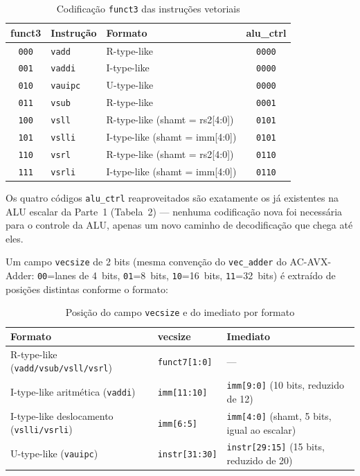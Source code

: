 \documentclass[12pt, a4paper]{article}
\newcommand{\code}[1]{\texttt{#1}}
\begin{document}
\begin{table}[H]
  \centering
  \caption{Codificação \code{funct3} das instruções vetoriais}
  \small{}
  \begin{tabular}{cllc}
    \toprule
    \rowcolor{headerblue}
    \color{white}\textbf{funct3} & \color{white}\textbf{Instrução} &
    \color{white}\textbf{Formato} & \color{white}\textbf{alu\_ctrl} \\
    \midrule
    \code{000} & \code{vadd}  & R-type-like & \code{0000} \\
    \code{001} & \code{vaddi} & I-type-like & \code{0000} \\
    \code{010} & \code{vauipc}& U-type-like & \code{0000} \\
    \code{011} & \code{vsub}  & R-type-like & \code{0001} \\
    \code{100} & \code{vsll}  & R-type-like (shamt = rs2[4:0]) & \code{0101} \\
    \code{101} & \code{vslli} & I-type-like (shamt = imm[4:0]) & \code{0101} \\
    \code{110} & \code{vsrl}  & R-type-like (shamt = rs2[4:0]) & \code{0110} \\
    \code{111} & \code{vsrli} & I-type-like (shamt = imm[4:0]) & \code{0110} \\
    \bottomrule
  \end{tabular}
\end{table}

Os quatro códigos \code{alu\_ctrl} reaproveitados são exatamente os já
existentes na ALU escalar da Parte~1 (Tabela~2) --- nenhuma codificação
nova foi necessária para o controle da ALU, apenas um novo caminho de
decodificação que chega até eles.

Um campo \code{vecsize} de 2 bits (mesma convenção do \code{vec\_adder}
do AC-AVX-Adder: \code{00}=lanes de 4~bits, \code{01}=8~bits,
\code{10}=16~bits, \code{11}=32~bits) é extraído de posições distintas
conforme o formato:

\begin{table}[H]
  \centering
  \caption{Posição do campo \code{vecsize} e do imediato por formato}
  \label{tab:vecsize-format}
  \small{}
  \begin{tabular}{lll}
    \toprule
    \rowcolor{headerblue}
    \color{white}\textbf{Formato} & \color{white}\textbf{vecsize} &
    \color{white}\textbf{Imediato} \\
    \midrule
    R-type-like (\code{vadd/vsub/vsll/vsrl}) & \code{funct7[1:0]} & --- \\
    I-type-like aritmética (\code{vaddi}) & \code{imm[11:10]} &
      \code{imm[9:0]} (10 bits, reduzido de 12) \\
    I-type-like deslocamento (\code{vslli/vsrli}) & \code{imm[6:5]} &
      \code{imm[4:0]} (shamt, 5 bits, igual ao escalar) \\
    U-type-like (\code{vauipc}) & \code{instr[31:30]} &
      \code{instr[29:15]} (15 bits, reduzido de 20) \\
    \bottomrule
  \end{tabular}
\end{table}
\end{document}
